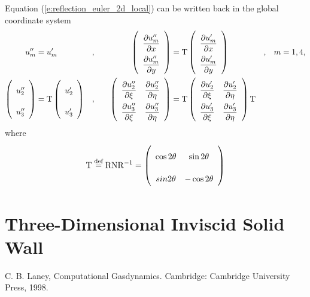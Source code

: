 \documentclass[a4paper,12pt,dvips]{article}
\newcommand*\defeq{\buildrel{\text{def}}\over{=}}
\begin{document}
Equation (\ref{e:reflection_euler_2d_local}) can be written back in the global
coordinate system
\begin{alignat}{4}
\renewcommand{\arraystretch}{2.2}
\begin{aligned}
  u''_m &= u'_m&,& \quad
  &\left(\begin{array}{c}
    \dfrac{\partial u''_m}{\partial x} \\
    \dfrac{\partial u''_m}{\partial y}
  \end{array}\right)
  &= \mathrm{T} \left(\begin{array}{c}
    \dfrac{\partial u'_m}{\partial x} \\
    \dfrac{\partial u'_m}{\partial y}
  \end{array}\right)&,& \quad m = 1, 4, \\
  \left(\begin{array}{c}
    u''_2 \\ u''_3
  \end{array}\right)
  &= \mathrm{T} \left(\begin{array}{c}
    u'_2 \\ u'_3
  \end{array}\right)&,& \quad
  &\left(\begin{array}{cc}
    \dfrac{\partial u''_2}{\partial\xi} &
    \dfrac{\partial u''_2}{\partial\eta} \\
    \dfrac{\partial u''_3}{\partial\xi} &
    \dfrac{\partial u''_3}{\partial\eta}
  \end{array}\right)
  &= \mathrm{T} \left(\begin{array}{cc}
    \dfrac{\partial u'_2}{\partial\xi} &
    \dfrac{\partial u'_2}{\partial\eta} \\
    \dfrac{\partial u'_3}{\partial\xi} &
    \dfrac{\partial u'_3}{\partial\eta}
  \end{array}\right) \mathrm{T}&&
\end{aligned} \label{e:reflection_euler_2d_global}
\end{alignat}
where
\begin{align}
  \mathrm{T} \defeq \mathrm{R}\mathrm{N}\mathrm{R}^{-1}
  = \left(\begin{array}{cc}
    \cos2\theta & \sin2\theta \\ sin2\theta & -\cos2\theta
  \end{array}\right) \label{e:reflection_T}
\end{align}

\section{Three-Dimensional Inviscid Solid Wall}

\begin{thebibliography}{99}
 C. B. Laney, Computational Gasdynamics.
Cambridge: Cambridge University Press, 1998.
\end{thebibliography}
\end{document}

